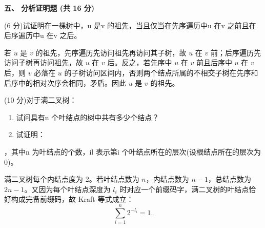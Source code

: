 \textbf{五、 分析证明题 (共 16 分)}
\begin{question}
(6 分)试证明在一棵树中，u 是v 的祖先，当且仅当在先序遍历中u 在v 之前且在后序遍历中u 在v 之后。
\begin{solution}
若 $u$ 是 $v$ 的祖先，先序遍历先访问祖先再访问其子树，故 $u$ 在 $v$ 前；后序遍历先访问子树再访问祖先，故 $u$ 在 $v$ 后。反之，若先序中 $u$ 在 $v$ 前且后序中 $u$ 在 $v$ 后，则 $v$ 必落在 $u$ 的子树访问区间内，否则两个结点所属的不相交子树在先序和后序中的相对次序会相同，矛盾。因此 $u$ 是 $v$ 的祖先。
\end{solution}
\end{question}

\begin{question}
(10 分)对于满二叉树：
\begin{enumerate}
  \item 试问具有n 个叶结点的树中共有多少个结点？
  \item 试证明：
\end{enumerate}
，其中n 为叶结点的个数，il 表示第i 个叶结点所在的层次(设根结点所在的层次为0)。
\begin{solution}
满二叉树每个内结点度为 2。若叶结点数为 $n$，内结点数为 $n-1$，总结点数为 $2n-1$。又因为每个叶结点深度为 $l_i$ 时对应一个前缀码字，满二叉树的叶结点恰好构成完备前缀码，故 Kraft 等式成立：
  \[
    \sum_{i=1}^n 2^{-l_i}=1.
  \]
\end{solution}
\end{question}
